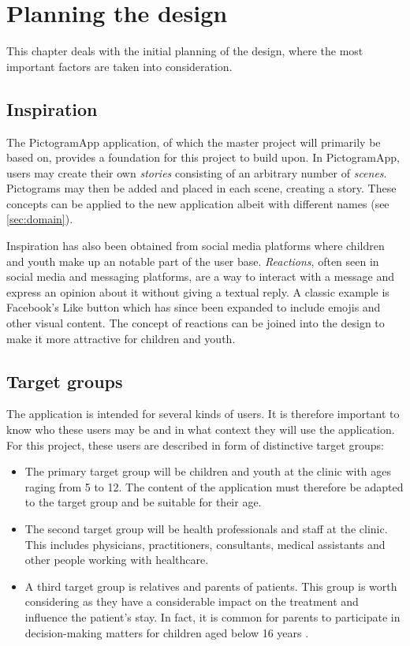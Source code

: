 \chapter{Planning the design}
\label{ch:planning}

This chapter deals with the initial planning of the design, where the most important factors are taken into consideration.

\section{Inspiration}
\label{sec:inspiration}

The PictogramApp application, of which the master project will primarily be based on, provides a foundation for this project to build upon. In PictogramApp, users may create their own \emph{stories} consisting of an arbitrary number of \emph{scenes}. Pictograms may then be added and placed in each scene, creating a story. These concepts can be applied to the new application albeit with different names (see \autoref{sec:domain}).

Inspiration has also been obtained from social media platforms where children and youth make up an notable part of the user base. \emph{Reactions}, often seen in social media and messaging platforms, are a way to interact with a message and express an opinion about it without giving a textual reply. A classic example is Facebook's Like button which has since been expanded to include emojis and other visual content. The concept of reactions can be joined into the design to make it more attractive for children and youth.

\section{Target groups}
\label{sec:targetgroups}

The application is intended for several kinds of users. It is therefore important to know who these users may be and in what context they will use the application. For this project, these users are described in form of distinctive target groups:

\begin{itemize}
    \item The primary target group will be children and youth at the clinic with ages raging from 5 to 12. The content of the application must therefore be adapted to the target group and be suitable for their age.
    \item The second target group will be health professionals and staff at the clinic. This includes physicians, practitioners, consultants, medical assistants and other people working with healthcare.
    \item A third target group is relatives and parents of patients. This group is worth considering as they have a considerable impact on the treatment and influence the patient's stay. In fact, it is common for parents to participate in decision-making matters for children aged below 16 years \autocite{helsedirektoratet2018}.
\end{itemize}


